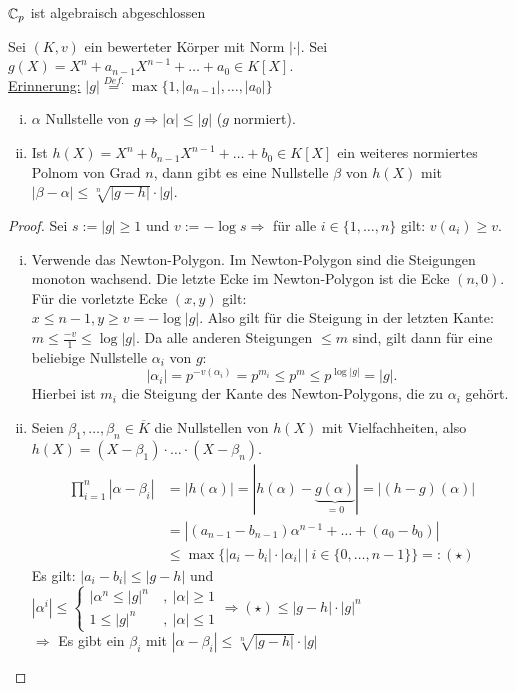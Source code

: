 \begin{Satz}
$\mathbb{C}_p$ ist algebraisch abgeschlossen
\end{Satz}

\begin{Prop}
Sei $(K,v)$ ein bewerteter Körper mit Norm $|\cdot|$. Sei $g(X)=X^n+a_{n-1}X^{n-1}+\dots+a_0 \in K[X]$.\\
\underline{Erinnerung:} $|g|\stackrel{Def.}{=} \max\{1,|a_{n-1}|, \dots, |a_0|\}$
\begin{enumerate}[i)]
\item $\alpha$ Nullstelle von $g \Rightarrow |\alpha| \leq |g|$ (\danger $g$ normiert).
\item Ist $h(X)=X^n+b_{n-1}X^{n-1}+\dots + b_0 \in K[X]$ ein weiteres normiertes Polnom von Grad $n$, dann gibt es eine Nullstelle $\beta$ von $h(X)$ mit $|\beta-\alpha| \leq \sqrt[n]{|g-h|} \cdot |g|$.
\end{enumerate}
\end{Prop}

\begin{proof}
Sei $s:=|g| \geq 1$ und $v:= - \log s \Rightarrow$ für alle $i \in \{1, \dots, n\}$ gilt: $v(a_i) \geq v$.
\begin{enumerate}[i)]
\item Verwende das Newton-Polygon. Im Newton-Polygon sind die Steigungen monoton wachsend.  Die letzte Ecke im Newton-Polygon ist die Ecke $(n,0)$. Für die vorletzte Ecke $(x,y)$ gilt:\\
$x \leq n-1, y \geq v=- \log|g|$. Also gilt für die Steigung in der letzten Kante: $m \leq \frac{-v}{1} \leq \log|g|$. Da alle anderen Steigungen $\leq m$ sind, gilt dann für eine beliebige Nullstelle $\alpha_i$ von $g$:
\[|\alpha_i|=p^{-v(\alpha_i)}=p^{m_i} \leq p^m \leq p^{\log|g|}=|g|.\]
Hierbei ist $m_i$ die Steigung der Kante des Newton-Polygons, die zu $\alpha_i$ gehört.
\item Seien $\beta_1, \dots, \beta_n \in \overline{K}$ die Nullstellen von $h(X)$ mit Vielfachheiten, also $h(X)=(X-\beta_1) \cdot \ldots \cdot (X-\beta_n)$.
\begin{align*}
\prod_{i=1}^n |\alpha-\beta_i|&=|h(\alpha)|=|h(\alpha)-\underbrace{g(\alpha)}_{=0}|=|(h-g)(\alpha)|\\
&=|(a_{n-1}-b_{n-1})\alpha^{n-1}+ \dots + (a_0-b_0)|\\
& \leq \max\{|a_i-b_i|\cdot|\alpha_i| \ | \ i \in \{0, \dots, n-1\}\} =: (\star)
\end{align*}
Es gilt: $|a_i-b_i| \leq |g-h|$ und $|\alpha^i| \leq \begin{cases}
|\alpha^n \leq |g|^n \ &, \ |\alpha| \geq 1\\
1 \leq |g|^n \ &, \ |\alpha| \leq 1
\end{cases}
\Rightarrow (\star) \leq |g-h|\cdot |g|^n$\\
$\Rightarrow$ Es gibt ein $\beta_i$ mit $|\alpha-\beta_i| \leq \sqrt[n]{|g-h|}\cdot |g|$
\end{enumerate}
\end{proof}

